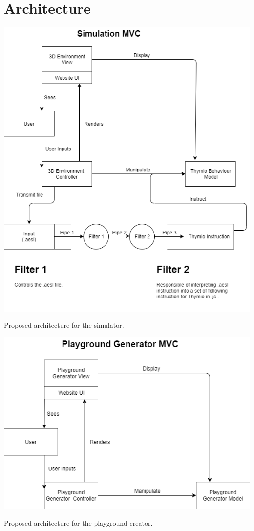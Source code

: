 \documentclass{scrartcl}
\begin{document}

\section{Architecture}
\begin{center}
  \includegraphics[width=\textwidth]{./architecture_proposal-Page-1}
\end{center}
Proposed architecture for the simulator.

\begin{center}
  \includegraphics[width=\textwidth]{./architecture_proposal-Page-2}
\end{center}
Proposed architecture for the playground creator.
\end{document}

